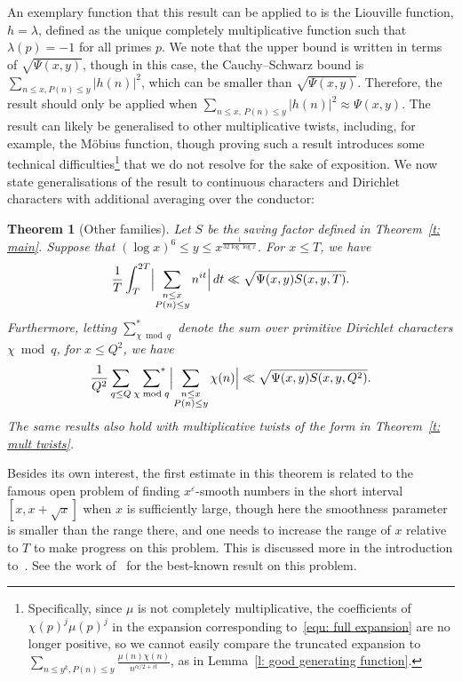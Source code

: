 \documentclass[a4paper,12pt,reqno]{amsart}
\newtheorem{theorem}{Theorem}
\begin{document}
An exemplary function that this result can be applied to is the Liouville function, $ h = \lambda$, defined as the unique completely multiplicative function such that $\lambda (p) = -1$ for all primes $p$. We note that the upper bound is written in terms of $\sqrt{\Psi(x,y)}$, though in this case, the Cauchy--Schwarz bound is $\sum_{n \leq x, P(n) \leq y} |h(n)|^2$, which can be smaller than $\sqrt{\Psi (x,y)}$. Therefore, the result should only be applied when $\sum_{n \leq x , \, P(n) \leq y} |h(n)|^2 \approx \Psi (x,y)$. The result can likely be generalised to other multiplicative twists, including, for example, the Möbius function, though proving such a result introduces some technical difficulties\footnote{Specifically, since $\mu$ is not completely multiplicative, the coefficients of $\chi(p)^j \mu(p)^j$ in the expansion corresponding to~\eqref{equ: full expansion} are no longer positive, so we cannot easily compare the truncated expansion to $\sum_{n \leq y^k, P(n) \leq y} \frac{\mu (n) \chi (n)}{n^{\alpha/2 + it}}$, as in Lemma~\ref{l: good generating function}.} that we do not resolve for the sake of exposition. We now state generalisations of the result to continuous characters and Dirichlet characters with additional averaging over the conductor:

\begin{theorem}[Other families]\label{t: other families}
Let $S$ be the saving factor defined in Theorem~\ref{t: main}. Suppose that $(\log x)^6 \leq y \leq x^{\frac{1}{32 \log \log x}}$. For $x \leq T$, we have
\[
\frac{1}{T} \int_{T}^{2T} \Bigl| \sum_{\substack{n \leq x \\ P(n) \leq y}} n^{it} \Bigr| \, dt \ll \sqrt{\Psi (x,y) S(x,y, T)}.
\]
Furthermore, letting $\sum\nolimits^{*}_{\chi \bmod q}$ denote the sum over primitive Dirichlet characters $\chi \bmod q$, for $x \leq Q^2$, we have
\[
\frac{1}{Q^2} \sum_{q \leq Q} \, \, \sideset{}{^*}\sum_{\chi \bmod q} \Bigl| \sum_{\substack{n \leq x \\ P(n) \leq y}} \chi(n) \Bigr| \ll \sqrt{\Psi (x,y) S(x,y, Q^2)}.
\]
The same results also hold with multiplicative twists of the form in Theorem~\ref{t: mult twists}.
\end{theorem}

Besides its own interest, the first estimate in this theorem is related to the famous open problem of finding $x^{\varepsilon}$-smooth numbers in the short interval $[x, x+\sqrt{x}]$ when $x$ is sufficiently large, though here the smoothness parameter is smaller than the range there, and one needs to increase the range of $x$ relative to $T$ to make progress on this problem. This is discussed more in the introduction to~\cite{HardyXu}. See the work of~\citet{MR16} for the best-known result on this problem.
\end{document}
